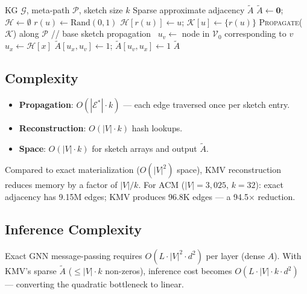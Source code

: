 \documentclass[sigconf]{acmart}
\newcommand{\Atilde}{\tilde{A}}
\begin{document}
\begin{algorithm}[t]
\caption{KMV Graph Reconstruction}
\label{alg:reconstruction}
\begin{algorithmic}[1]
\REQUIRE KG $\mathcal{G}$, meta-path $\mathcal{P}$, sketch size $k$
\ENSURE Sparse approximate adjacency $\Atilde$
\STATE $\Atilde \gets \mathbf{0}$; $\mathcal{H} \gets \emptyset$
  \STATE $r(u) \gets \text{Rand}(0,1)$
  \STATE $\mathcal{H}[r(u)] \gets u$; $\mathcal{K}[u] \gets \{r(u)\}$
\ENDFOR
\STATE \textsc{Propagate}($\mathcal{K}$) along $\mathcal{P}$ \hfill // base sketch propagation~\cite{berahmand2024kmv}
  \STATE $u_v \gets$ node in $\mathcal{V}_0$ corresponding to $v$
    \STATE $u_x \gets \mathcal{H}[x]$ \hfill {}
    \STATE $\Atilde[u_x, u_v] \gets 1$; $\Atilde[u_v, u_x] \gets 1$
  \ENDFOR
\ENDFOR
\RETURN $\Atilde$
\end{algorithmic}
\end{algorithm}

\subsection{Complexity}

\begin{itemize}
\item \textbf{Propagation}: $O(|\mathcal{E}^*| \cdot k)$ --- each edge traversed once per sketch entry.
\item \textbf{Reconstruction}: $O(|V| \cdot k)$ hash lookups.
\item \textbf{Space}: $O(|V| \cdot k)$ for sketch arrays and output $\Atilde$.
\end{itemize}

Compared to exact materialization ($O(|V|^2)$ space), KMV reconstruction reduces memory by a factor of $|V|/k$.
For ACM ($|V| = 3{,}025$, $k = 32$): exact adjacency has 9.15M edges; KMV produces 96.8K edges --- a 94.5$\times$ reduction.

\subsection{Inference Complexity}

Exact GNN message-passing requires $O(L \cdot |V|^2 \cdot d^2)$ per layer (dense $A$).
With KMV's sparse $\Atilde$ ($\leq |V| \cdot k$ non-zeros), inference cost becomes $O(L \cdot |V| \cdot k \cdot d^2)$ --- converting the quadratic bottleneck to linear.
\end{document}
